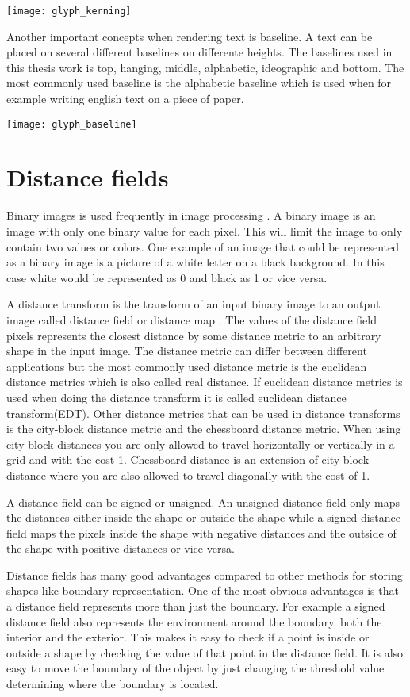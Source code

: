 \texttt{[image: glyph\_kerning]}

Another important concepts when rendering text is baseline. A text can be placed on several different baselines on differente heights. The baselines used in this thesis work is top, hanging, middle, alphabetic, ideographic and bottom. The most commonly used baseline is the alphabetic baseline which is used when for example writing english text on a piece of paper.

\texttt{[image: glyph\_baseline]}

\section{Distance fields}\label{distancefield}
Binary images is used frequently in image processing \citep{Ragnemalm:1993}. A binary image is an image with only one binary value for each pixel. This will limit the image to only contain two values or colors. One example of an image that could be represented as a binary image is a picture of a white letter on a black background. In this case white would be represented as 0 and black as 1 or vice versa.

A distance transform is the transform of an input binary image to an output image called distance field or distance map \citep{rosenfeld1966}. The values of the distance field pixels represents the closest distance by some distance metric to an arbitrary shape in the input image. The distance metric can differ between different applications but the most commonly used distance metric is the euclidean distance metrics which is also called real distance. If euclidean distance metrics is used when doing the distance transform it is called euclidean distance transform(EDT). Other distance metrics that can be used in distance transforms is the city-block distance metric and the chessboard distance metric. When using city-block distances you are only allowed to travel horizontally or vertically in a grid and with the cost 1. Chessboard distance is an extension of city-block distance where you are also allowed to travel diagonally with the cost of 1. 

A distance field can be signed or unsigned. An unsigned distance field only maps the distances either inside the shape or outside the shape while a signed distance field maps the pixels inside the shape with negative distances and the outside of the shape with positive distances or vice versa.

Distance fields has many good advantages compared to other methods for storing shapes like boundary representation. One of the most obvious advantages is that a distance field represents more than just the boundary. For example a signed distance field also represents the environment around the boundary, both the interior and the exterior. This makes it easy to check if a point is inside or outside a shape by checking the value of that point in the distance field. It is also easy to move the boundary of the object by just changing the threshold value determining where the boundary is located. \citep{Jones2006}

